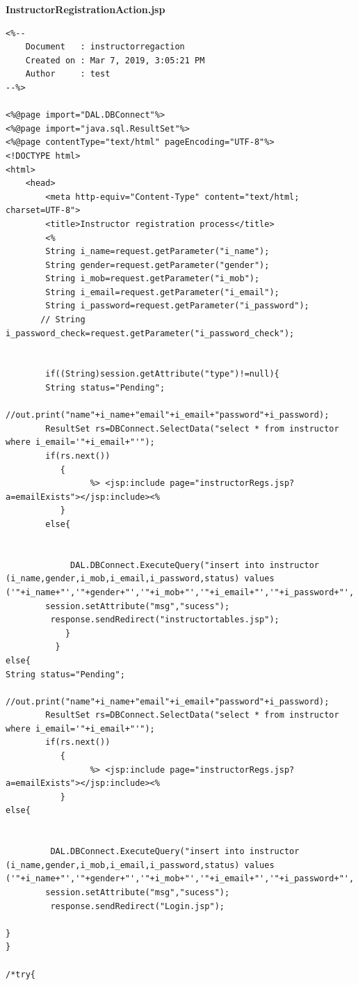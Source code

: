 {\bf InstructorRegistrationAction.jsp}
\begin{lstlisting}
<%-- 
    Document   : instructorregaction
    Created on : Mar 7, 2019, 3:05:21 PM
    Author     : test
--%>

<%@page import="DAL.DBConnect"%>
<%@page import="java.sql.ResultSet"%>
<%@page contentType="text/html" pageEncoding="UTF-8"%>
<!DOCTYPE html>
<html>
    <head>
        <meta http-equiv="Content-Type" content="text/html; charset=UTF-8">
        <title>Instructor registration process</title>
        <%
        String i_name=request.getParameter("i_name");
        String gender=request.getParameter("gender");
        String i_mob=request.getParameter("i_mob");
        String i_email=request.getParameter("i_email");
        String i_password=request.getParameter("i_password");
       // String i_password_check=request.getParameter("i_password_check");
          
        
        if((String)session.getAttribute("type")!=null){
        String status="Pending";
        //out.print("name"+i_name+"email"+i_email+"password"+i_password);
        ResultSet rs=DBConnect.SelectData("select * from instructor where i_email='"+i_email+"'");
        if(rs.next())
           {
                 %> <jsp:include page="instructorRegs.jsp?a=emailExists"></jsp:include><%
           }
        else{
       

             DAL.DBConnect.ExecuteQuery("insert into instructor (i_name,gender,i_mob,i_email,i_password,status) values ('"+i_name+"','"+gender+"','"+i_mob+"','"+i_email+"','"+i_password+"','"+status+"')");
        session.setAttribute("msg","sucess");
         response.sendRedirect("instructortables.jsp");
            }
          }
else{
String status="Pending";
        //out.print("name"+i_name+"email"+i_email+"password"+i_password);
        ResultSet rs=DBConnect.SelectData("select * from instructor where i_email='"+i_email+"'");
        if(rs.next())
           {
                 %> <jsp:include page="instructorRegs.jsp?a=emailExists"></jsp:include><%
           }
else{
       

         DAL.DBConnect.ExecuteQuery("insert into instructor (i_name,gender,i_mob,i_email,i_password,status) values ('"+i_name+"','"+gender+"','"+i_mob+"','"+i_email+"','"+i_password+"','"+status+"')");
        session.setAttribute("msg","sucess");
         response.sendRedirect("Login.jsp");

}
}
        
/*try{
                                             

\end{lstlisting}
